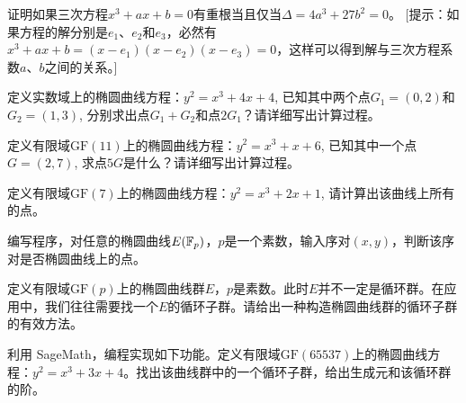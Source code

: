 \begin{problemset}
\item 证明如果三次方程$x^3 + ax + b = 0$有重根当且仅当$\Delta = 4a^3 + 27b^2 = 0$。
[提示：如果方程的解分别是$e_1$、$e_2$和$e_3$，必然有
$x^3 + ax + b = (x - e_1)(x - e_2)(x - e_3) = 0$，这样可以得到解与三次方程系数$a$、$b$之间的关系。]

\item 定义实数域上的椭圆曲线方程：$y^2 = x^3 + 4x + 4$, 已知其中两个点$G_1=(0, 2)$和$G_2 = (1, 3)$, 分别求出点$G_1+ G_2$和点$2G_1$？请详细写出计算过程。

\item 定义有限域$\mathrm{GF}(11)$上的椭圆曲线方程：$y^2 = x^3 + x + 6$, 已知其中一个点$G=(2, 7)$, 求点$5G$是什么？请详细写出计算过程。

\item 定义有限域$\mathrm{GF}(7)$上的椭圆曲线方程：$y^2 = x^3 + 2x + 1$, 请计算出该曲线上所有的点。

\item 编写程序，对任意的椭圆曲线$E({\mathbb F}_p)$，$p$是一个素数，输入序对$(x, y)$，判断该序对是否椭圆曲线上的点。

\item 定义有限域$\mathrm{GF}(p)$上的椭圆曲线群$E$，$p$是素数。此时$E$并不一定是循环群。在应用中，我们往往需要找一个$E$的循环子群。请给出一种构造椭圆曲线群的循环子群的有效方法。

\item 利用 SageMath，编程实现如下功能。定义有限域$\mathrm{GF}(65537)$上的椭圆曲线方程：$y^2 = x^3 + 3x + 4$。找出该曲线群中的一个循环子群，给出生成元和该循环群的阶。
\end{problemset}
